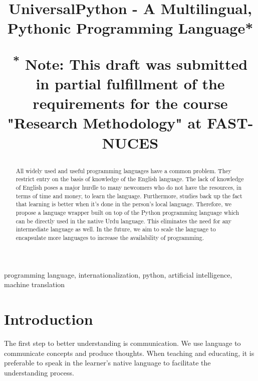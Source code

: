 \documentclass[conference]{IEEEtran}
\begin{document}
\title{UniversalPython - A Multilingual, Pythonic Programming Language*\\
{\footnotesize \textsuperscript{*}
Note: This draft was submitted in partial fulfillment of the requirements for the course "Research Methodology"
at FAST-NUCES

}
}

\author{
}

\maketitle

\begin{abstract}
    All widely used and useful programming languages have a common problem. They restrict entry on the basis of knowledge of the English language. The lack of knowledge of English poses a major hurdle to many newcomers who do not have the resources, in terms of time and money, to learn the language. Furthermore, studies back up the fact that learning is better when it’s done in the person’s local language. Therefore, we propose a language wrapper built on top of the Python programming language which can be directly used in the native Urdu language. This eliminates the need for any intermediate language as well. In the future, we aim to scale the language to encapsulate more languages to increase the availability of programming.
\end{abstract}

\begin{IEEEkeywords}
programming language, internationalization, python, artificial intelligence, machine translation
\end{IEEEkeywords}

\section{Introduction}

The first step to better understanding is communication. We use language to communicate concepts and produce thoughts. When teaching and educating, it is preferable to speak in the learner's native language to facilitate the understanding process.
\end{document}
